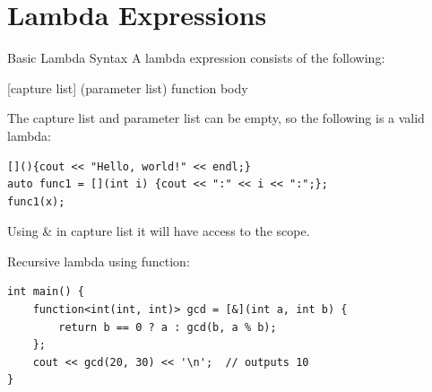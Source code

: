 \section{Lambda Expressions}
Basic Lambda Syntax
    A lambda expression consists of the following:
\begin{center}
    [capture list] (parameter list) {function body}
\end{center}
The capture list and parameter list can be empty, so the following is a valid lambda:
\begin{lstlisting}
[](){cout << "Hello, world!" << endl;}
auto func1 = [](int i) {cout << ":" << i << ":";};
func1(x);
\end{lstlisting}
Using \& in capture list it will have access to the scope.

Recursive lambda using function:
\begin{lstlisting}
int main() {
	function<int(int, int)> gcd = [&](int a, int b) {
		return b == 0 ? a : gcd(b, a % b);
	};
	cout << gcd(20, 30) << '\n';  // outputs 10
}
\end{lstlisting}
